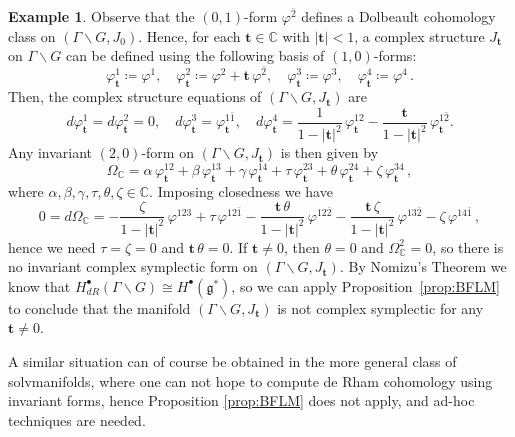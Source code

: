 \documentclass[a4paper]{amsart}
\theoremstyle{definition}
\newtheorem{example}[theorem]{Example}
\theoremstyle{remark}
\numberwithin{equation}{section}
\begin{document}
\begin{example}
Observe that the $(0,1)$-form $\varphi^{\bar2}$ defines a Dolbeault cohomology class on $(\Gamma\backslash G,J_0)$. Hence, for each $\mathbf{t}\in\mathbb C$ with $|\mathbf{t}|<1$, a complex structure $J_\mathbf{t}$ on $\Gamma\backslash G$ can  be defined using the following basis of $(1,0)$-forms:
\[
\varphi_{\mathbf{t}}^1\coloneqq\varphi^1, \quad 
\varphi_{\mathbf{t}}^2\coloneqq\varphi^2+\mathbf{t}\,\varphi^{\bar2},\quad
\varphi_{\mathbf{t}}^3\coloneqq\varphi^3,\quad 
\varphi_{\mathbf{t}}^4\coloneqq\varphi^4\,.
\]
Then, the complex structure equations of $(\Gamma\backslash G,J_{\mathbf{t}})$ are
\begin{equation}\label{ex:deformed-CSnilm-1}
d\varphi_{\mathbf{t}}^1=d\varphi_{\mathbf{t}}^2=0, \quad 
d\varphi_{\mathbf{t}}^3=\varphi_{\mathbf{t}}^{1\bar1}, \quad
d\varphi_{\mathbf{t}}^4=\frac{1}{1-|{\mathbf{t}}|^2}\,\varphi_{\mathbf{t}}^{12}
-\frac{{\mathbf{t}}}{1-|{\mathbf{t}}|^2}\,\varphi_{\mathbf{t}}^{1\bar2}.
\end{equation}
Any invariant $(2,0)$-form on $(\Gamma\backslash G,J_{\mathbf{t}})$ is then given by
\[
\Omega_{\mathbb C}=\alpha\,\varphi_{\mathbf{t}}^{12}
	+\beta\,\varphi_{\mathbf{t}}^{13}+\gamma\,\varphi_{\mathbf{t}}^{14}
	+\tau\,\varphi_{\mathbf{t}}^{23}+\theta\,\varphi_{\mathbf{t}}^{24}
	+\zeta\,\varphi_{\mathbf{t}}^{34}\,,
\]
where $\alpha,\beta,\gamma,\tau,\theta,\zeta\in\mathbb C$. Imposing closedness we have
\[
0=d\Omega_{\mathbb C}=-\frac{\zeta}{1-|\mathbf t|^2}\,\varphi^{123}
	+\tau\,\varphi^{12\bar1}-\frac{\mathbf t\,\theta}{1-|\mathbf t|^2}\,\varphi^{12\bar2}
	-\frac{\mathbf t\,\zeta}{1-|\mathbf t|^2}\,\varphi^{13\bar2}-\zeta\,\varphi^{14\bar1}\,,
\]
hence we need $\tau=\zeta=0$ and $\mathbf t\,\theta=0$. If $\mathbf t\neq 0$, then $\theta=0$ and $\Omega_{\mathbb C}^2=0$, so there is no invariant complex symplectic form on $(\Gamma\backslash G,J_{\mathbf{t}})$. By Nomizu's Theorem we know that $H^{\bullet}_{dR}(\Gamma\backslash G)\cong H^{\bullet}(\mathfrak g^*)$, so we can apply Proposition~\ref{prop:BFLM} to conclude that the manifold $(\Gamma\backslash G,J_{\mathbf{t}})$ is not complex symplectic for any $\mathbf t\neq 0$.
\end{example}

A similar situation can of course be obtained in the more general class of solvmanifolds, where one can not hope to compute de Rham cohomology using invariant forms, hence Proposition \ref{prop:BFLM} does not apply, and ad-hoc techniques are needed.
\end{document}
